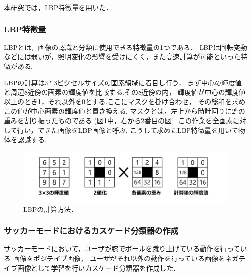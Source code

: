 本研究では，LBP特徴量を用いた．


\clearpage
\subsubsection{LBP特徴量}
LBPとは，画像の認識と分類に使用できる特徴量の1つである\cite{adafig}\cite{lbp}．
LBPは回転変動などには弱いが，照明変化の影響を受けにくく，また高速計算が可能といった特徴がある.

LBPの計算は$3*3$ピクセルサイズの画素領域に着目し行う．
まず中心の輝度値と周辺8近傍の画素の輝度値を比較する.その8近傍の内，
輝度値が中心の輝度値以上のとき1，それ以外を0とする.ここにマスクを掛け合わせ，
その総和を求めこの値が中心画素の輝度値と置き換える. 
マスクとは，左上から時計回りに$2^n$の重みを割り振ったものである (図\ref{lbpfig}中，右から2番目の図).
この作業を全画素に対して行い，できた画像をLBP画像と呼ぶ.
こうして求めたLBP特徴量を用いて物体を認識する.

\vspace{1.5cm}

\begin{figure}[h]
    \centering
    \includegraphics[width=13cm]{image/lbpfig.png}
    \caption[LBPの計算方法]{LBPの計算方法\cite{adafig}．}
  \label{lbpfig}
\end{figure}


\clearpage
\subsubsection{サッカーモードにおけるカスケード分類器の作成}
サッカーモードにおいて，ユーザが膝でボールを蹴り上げている動作を行っている
画像をポジテイブ画像，
ユーザがそれ以外の動作を行っている画像をネガテイブ画像として学習を行いカスケード分類器を作成した．

\vspace{1.5cm}

